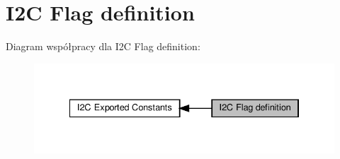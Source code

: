 \hypertarget{group___i2_c___flag__definition}{}\section{I2C Flag definition}
\label{group___i2_c___flag__definition}
Diagram współpracy dla I2C Flag definition\+:\nopagebreak
\begin{figure}[H]
\begin{center}
\leavevmode
\includegraphics[width=334pt]{group___i2_c___flag__definition}
\end{center}
\end{figure}
